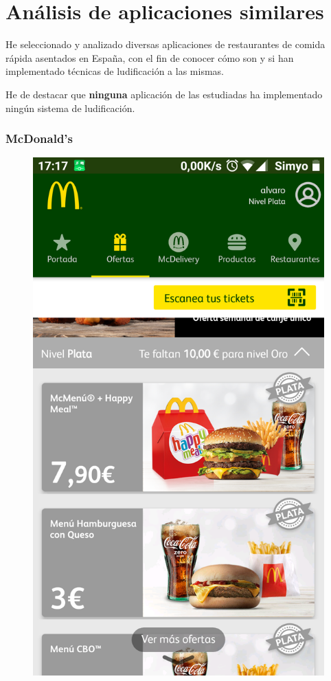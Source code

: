 \documentclass[twoside]{report}
\begin{document}
\section{Análisis de aplicaciones similares}

He seleccionado y analizado diversas aplicaciones de restaurantes de comida rápida asentados en España, con el fin de conocer cómo son y si han implementado técnicas de ludificación a las mismas.

He de destacar que \textbf{ninguna} aplicación de las estudiadas ha implementado ningún sistema de ludificación.

\subsubsection{McDonald's}

\begin{figure}[H]
\begin{center}
\includegraphics[scale=0.10]{images/restaurantes/mcdo0.png}

\end{center}
\end{figure}
\end{document}
